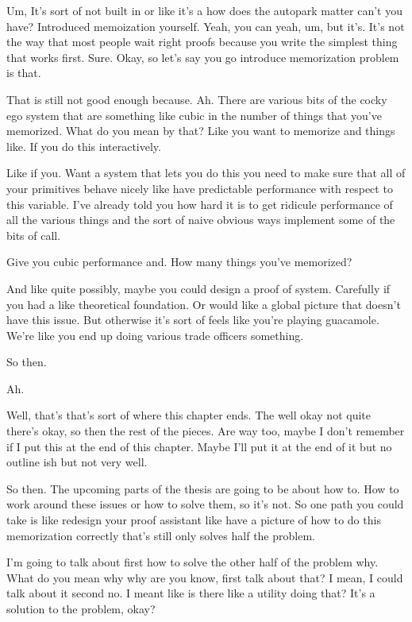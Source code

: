 \begin{subappendices}
    Um, It's sort of not built in or like it's a how does the autopark matter can't you have? Introduced memoization yourself. Yeah, you can yeah, um, but it's. It's not the way that most people wait right proofs because you write the simplest thing that works first. Sure. Okay, so let's say you go introduce memorization problem is that. 
    
    That is still not good enough because. Ah. There are various bits of the cocky ego system that are something like cubic in the number of things that you've memorized. What do you mean by that? Like you want to memorize and things like. If you do this interactively. 
    
    Like if you. Want a system that lets you do this you need to make sure that all of your primitives behave nicely like have predictable performance with respect to this variable. I've already told you how hard it is to get ridicule performance of all the various things and the sort of naive obvious ways implement some of the bits of call. 
    
    Give you cubic performance and. How many things you've memorized? 
    
    And like quite possibly, maybe you could design a proof of system. Carefully if you had a like theoretical foundation. Or would like a global picture that doesn't have this issue. But otherwise it's sort of feels like you're playing guacamole. We're like you end up doing various trade officers something. 
    
    So then. 
    
    Ah. 
    
    Well, that's that's sort of where this chapter ends. The well okay not quite there's okay, so then the rest of the pieces. Are way too, maybe I don't remember if I put this at the end of this chapter. Maybe I'll put it at the end of it but no outline ish but not very well. 
    
    So then. The upcoming parts of the thesis are going to be about how to. How to work around these issues or how to solve them, so it's not. So one path you could take is like redesign your proof assistant like have a picture of how to do this memorization correctly that's still only solves half the problem. 
    
    I'm going to talk about first how to solve the other half of the problem why. What do you mean why why are you know, first talk about that? I mean, I could talk about it second no. I meant like is there like a utility doing that? It's a solution to the problem, okay? 
    

\end{subappendices}
